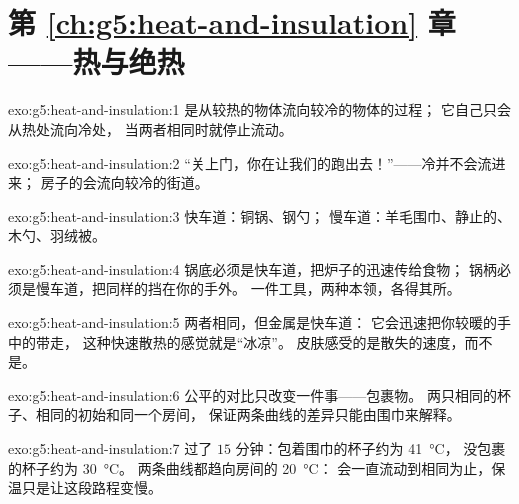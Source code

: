 \section*{第 \ref{ch:g5:heat-and-insulation} 章——热与绝热}

\begin{solution}{exo:g5:heat-and-insulation:1}
是从较热的物体流向较冷的物体的过程；
它自己只会从热处流向冷处，
当两者相同时就停止流动。
\end{solution}

\begin{solution}{exo:g5:heat-and-insulation:2}
“关上门，你在让我们的跑出去！”——冷并不会流进来；
房子的会流向较冷的街道。
\end{solution}

\begin{solution}{exo:g5:heat-and-insulation:3}
快车道：铜锅、钢勺；
慢车道：羊毛围巾、静止的、木勺、羽绒被。
\end{solution}

\begin{solution}{exo:g5:heat-and-insulation:4}
锅底必须是快车道，把炉子的迅速传给食物；
锅柄必须是慢车道，把同样的挡在你的手外。
一件工具，两种本领，各得其所。
\end{solution}

\begin{solution}{exo:g5:heat-and-insulation:5}
两者相同，但金属是快车道：
它会迅速把你较暖的手中的带走，
这种快速散热的感觉就是“冰凉”。
皮肤感受的是散失的速度，而不是。
\end{solution}

\begin{solution}{exo:g5:heat-and-insulation:6}
公平的对比只改变一件事——包裹物。
两只相同的杯子、相同的初始和同一个房间，
保证两条曲线的差异只能由围巾来解释。
\end{solution}

\begin{solution}{exo:g5:heat-and-insulation:7}
过了 $15$ 分钟：包着围巾的杯子约为 \qty{41}{\celsius}，
没包裹的杯子约为 \qty{30}{\celsius}。
两条曲线都趋向房间的 \qty{20}{\celsius}：
会一直流动到相同为止，保温只是让这段路程变慢。
\end{solution}

